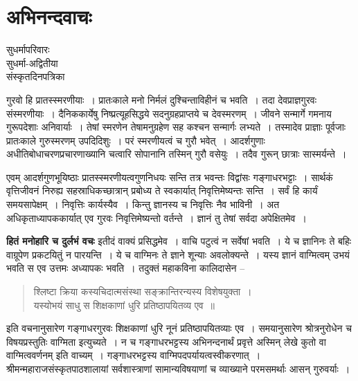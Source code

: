 \chapter{अभिनन्दवाचः}

\begin{center}
\smallskip
सुधर्मापरिवारः\\
सुधर्मा-अद्वितीया\\ 
संस्कृतदिनपत्रिका
\addrule
\end{center}

गुरवो हि प्रातस्स्मरणीयाः~। प्रातःकाले मनो निर्मलं दुश्चिन्ताविहीनं च भवति~। तदा देवप्राज्ञगुरवः संस्मरणीयाः~। दैनिककार्येषु निष्प्रत्यूहसिद्धये सदनुग्रहप्राप्तये च देवस्मरणम्~। जीवने सन्मार्गे गमनाय गुरूपदेशाः अनिवार्याः~। तेषां स्मरणेन तेषामनुग्रहेण सह कश्चन सन्मार्गः लभ्यते~। तस्मादेव प्राज्ञाः पूर्वजाः प्रातःकाले गुरुस्मरणम् उपदिदिशुः~। परं स्मरणीयत्वं च गुरौ भवेत्~। आदर्शगुणाः अधीतिबोधाचरणप्रचारणाख्यानि चत्वारि सोपानानि तस्मिन् गुरौ वसेयुः~। तदैव गुरून् छात्राः सास्मर्यन्ते~। 

एवम् आदर्शगुणभूयिष्ठाः प्रातस्स्मरणीयत्वगुणनिधयः सन्ति तत्र भवन्तः विद्वांसः गङ्गाधरभट्टाः~। सार्थकं वृत्तिजीवनं निरुह्य सहस्राधिकच्छात्रान् प्रबोध्य ते स्वकार्यात् निवृत्तिमेष्यन्तः सन्ति~। सर्वं हि कार्यं समयसापेक्षम्~। निवृत्तिः कार्यस्यैव~। किन्तु ज्ञानस्य च निवृत्तिः नैव भाविनी~। अत अधिकृताध्यापककार्यात् एव गुरवः निवृत्तिमेष्यन्तो वर्तन्ते~। ज्ञानं तु तेषां सर्वदा अपेक्षितमेव~।

\textbf{हितं मनोहारि च दुर्लभं वचः} इतीदं वाक्यं प्रसिद्धमेव~। वाचि पटुत्वं न सर्वेषां भवति~। ये च ज्ञानिनः ते बहिः वाग्रूपेण प्रकटयितुं न पारयन्ति~। ये च वाग्मिनः ते ज्ञाने शून्याः अवलोक्यन्ते~। यस्य ज्ञानं वाग्मित्वम् उभयं भवति स एव उत्तमः अध्यापकः भवति~। तदुक्तं महाकविना कालिदासेन --

\begin{verse}
श्लिष्टा क्रिया कस्यचिदात्मसंस्था सङ्क्रान्तिरन्यस्य विशेषयुक्ता~।\\
यस्योभयं साधु स शिक्षकाणां धुरि प्रतिष्ठापयितव्य एव~॥
\end{verse}

इति वचनानुसारेण गङ्गाधरगुरवः शिक्षकाणां धुरि नूनं प्रतिष्ठापयितव्याः एव~। समयानुसारेण श्रोत्रनुरोधेन च विषयप्रस्तुतिः वाग्मिता इत्युच्यते~। न च गङ्गाधरभट्टस्य अभिनन्दनार्थं प्रवृत्ते अस्मिन् लेखे कुतो वा वाग्मित्ववर्णनम् इति वाच्यम्~। गङ्गाधरभट्टस्य वाग्मिपदपर्यायत्वस्वीकरणात्~। श्रीमन्महाराजसंस्कृतपाठशालायां सर्वशास्त्राणां सामान्यविषयाणां च व्याख्याने परमसमर्थाः आसन् गुरुवर्याः~। 

